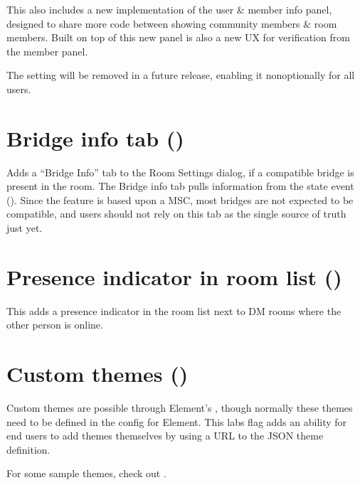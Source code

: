 \documentclass[letterpaper,10pt,openany,oneside,english]{sphinxmanual}
\begin{document}
\sphinxAtStartPar
This also includes a new implementation of the user \& member info panel, designed to share more code between showing community members \& room members. Built on top of this new panel is also a new UX for verification from the member panel.

\sphinxAtStartPar
The setting will be removed in a future release, enabling it non\sphinxhyphen{}optionally for
all users.


\chapter{Bridge info tab ()}
\label{\detokenize{labs:bridge-info-tab-feature-bridge-state}}
\sphinxAtStartPar
Adds a “Bridge Info” tab to the Room Settings dialog, if a compatible bridge is
present in the room. The Bridge info tab pulls information from the  state event (). Since the feature is based upon a MSC, most
bridges are not expected to be compatible, and users should not rely on this
tab as the single source of truth just yet.


\chapter{Presence indicator in room list ()}
\label{\detokenize{labs:presence-indicator-in-room-list-feature-presence-in-room-list}}
\sphinxAtStartPar
This adds a presence indicator in the room list next to DM rooms where the other
person is online.


\chapter{Custom themes ()}
\label{\detokenize{labs:custom-themes-feature-custom-themes}}
\sphinxAtStartPar
Custom themes are possible through Element’s , though
normally these themes need to be defined in the config for Element. This labs flag
adds an ability for end users to add themes themselves by using a URL to the JSON
theme definition.

\sphinxAtStartPar
For some sample themes, check out .
\end{document}
